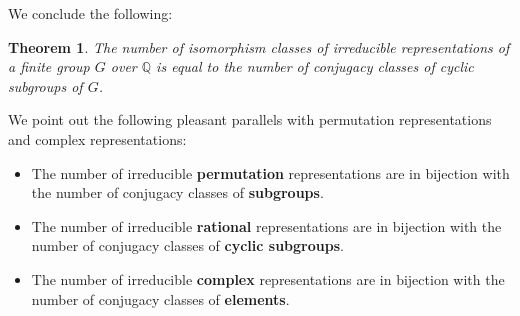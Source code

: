 \documentclass[12pt]{article}
\theoremstyle{plain}
\newtheorem{theorem}{Theorem}[section]
\theoremstyle{definition}
\theoremstyle{remark}
\numberwithin{equation}{section}
\begin{document}
We conclude the following:

\begin{theorem}
The number of isomorphism classes of irreducible representations of a
finite group $G$ over $\mathbb{Q}$ is equal to the number of conjugacy
classes of cyclic subgroups of $G$.
\end{theorem}

We point out the following pleasant parallels with permutation
representations and complex representations:

\begin{itemize}
\item The number of irreducible \textbf{permutation} representations are in
bijection with the number of conjugacy classes of \textbf{subgroups}.
\item The number of irreducible \textbf{rational} representations are in
bijection with the number of conjugacy classes of \textbf{cyclic
subgroups}.
\item The number of irreducible \textbf{complex} representations are in
bijection with the number of conjugacy classes of \textbf{elements}.
\end{itemize}



\end{document}
